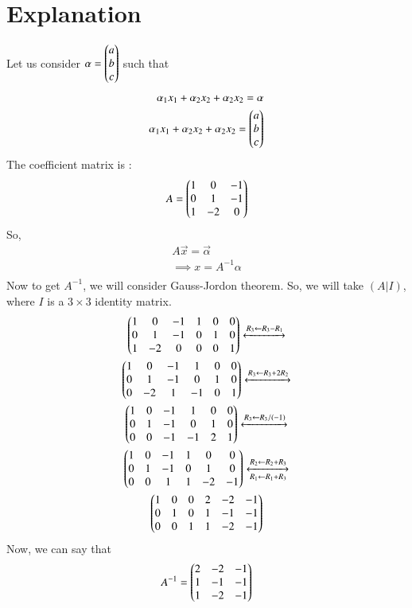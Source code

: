 \documentclass[journal,12pt,twocolumn]{IEEEtran}
\begin{document}
\section{Explanation}
Let us consider $\mathbf{\alpha} = \begin{pmatrix}a\\b\\c\end{pmatrix}$ such that
\begin{align}
\alpha_1 x_1 + \alpha_2 x_2 + \alpha_2 x_2 = \mathbf{\alpha}\\
\alpha_1 x_1 + \alpha_2 x_2 + \alpha_2 x_2 = \begin{pmatrix}a\\b\\c\end{pmatrix}
\end{align}
The coefficient matrix is :
\begin{align}
A = \begin{pmatrix}1 & 0 & -1\\0 & 1 & -1\\1 & -2 & 0\end{pmatrix}
\end{align}
So,
\begin{align}
A\vec{x}= \vec{\alpha}\\
\implies x = A^{-1} \alpha\\
\end{align}
Now to get $A^{-1}$, we will consider Gauss-Jordon theorem. So, we will take $(A|I)$, where $I$ is a $3\times3$ identity matrix.
\begin{multline}
\begin{pmatrix}1 & 0 & -1 & 1 & 0 & 0\\0 & 1 & -1 & 0 & 1 & 0\\1 & -2 & 0 & 0 & 0 & 1\end{pmatrix}\xleftrightarrow[]{R_3\leftarrow R_3-R_1}\\
\begin{pmatrix}1 & 0 & -1 & 1 & 0 & 0\\0 & 1 & -1 & 0 & 1 & 0\\0 & -2 & 1 & -1 & 0 & 1\end{pmatrix}
\xleftrightarrow[]{R_3\leftarrow R_3+2R_2}\\
\begin{pmatrix}1 & 0 & -1 & 1 & 0 & 0\\0 & 1 & -1 & 0 & 1 & 0\\0 & 0 & -1 & -1 & 2 & 1\end{pmatrix}\xleftrightarrow[]{R_3\leftarrow R_3/(-1)}\\
\begin{pmatrix}1 & 0 & -1 & 1 & 0 & 0\\0 & 1 & -1 & 0 & 1 & 0\\0 & 0 & 1 & 1 & -2 & -1\end{pmatrix}\xleftrightarrow[R_1\leftarrow R_1+R_3]{R_2\leftarrow R_2+R_3}\\
\begin{pmatrix}1 & 0 & 0 & 2 & -2 & -1\\0 & 1 & 0 & 1 & -1 & -1\\0 & 0 & 1 & 1 & -2 & -1\end{pmatrix}
\end{multline}
Now, we can say that
\begin{align}
A^{-1} = \begin{pmatrix}2 & -2 & -1\\1 & -1 & -1\\1 & -2 & -1\end{pmatrix}
\end{align}
\end{document}
